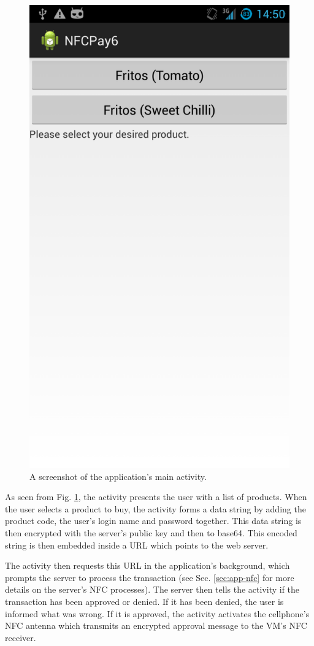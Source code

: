 \begin{figure}
 \centering 
 \includegraphics[clip = true, trim = 0 850 0 60,
 scale=0.2]{main_screenshot}
 \caption{A screenshot of the application's main activity.}
 \label{fig:main-activity-screenshot}
\end{figure}

As seen from Fig. \ref{fig:main-activity-screenshot}, the activity presents
the user with a list of products. When the user selects a product to buy, the
activity forms a data string by adding the product code, the user's login
name and password together. This data string is then encrypted with the
server's public key and then to base64. This encoded string
is then embedded inside a URL which points to the web server. 

The activity then requests this URL in the application's background, which prompts the
server to process the transaction (see Sec. \ref{sec:app-nfc} for more details on the
server's NFC processes). The server then tells the activity if the transaction
has been approved or denied. If it has been denied, the user is informed what was wrong. 
If it is approved, the activity activates the cellphone's NFC antenna which transmits an
encrypted approval message to the VM's NFC receiver.